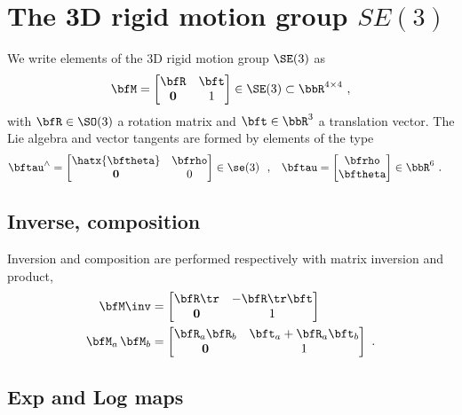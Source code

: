 

\section{The 3D rigid motion group $SE(3)$}
\label{sec:SE3}


We write elements of the 3D rigid motion group $\SE(3)$ as 
%
\begin{align}
\bfM= \begin{bmatrix}
\bfR & \bft \\ \bf0 & 1
\end{bmatrix} \in \SE(3) \subset \bbR^{4\times4}
~,
\end{align}
%
with $\bfR\in\SO(3)$ a rotation matrix and $\bft\in\bbR^3$ a translation vector.
The Lie algebra and vector tangents are formed by elements of the type
%
\begin{align}
\bftau^\wedge
  &= \begin{bmatrix}\hatx{\bth} & \bfrho \\ \bf0 & 0\end{bmatrix} \in \se(3)
  ~~,
& 
\bftau
  &= \begin{bmatrix}\bfrho \\ \bth\end{bmatrix}\in\bbR^6 
~.
\end{align}
%


\subsection{Inverse, composition}

Inversion and composition are performed respectively with matrix inversion and product,
%
\begin{align}
\bfM\inv &= \begin{bmatrix}
\bfR\tr & -\bfR\tr\bft \\ \bf0 & 1
\end{bmatrix} 
\\
\bfM_a\,\bfM_b &= \begin{bmatrix}
\bfR_a\bfR_b & \bft_a+\bfR_a\bft_b \\ \bf0 & 1
\end{bmatrix} 
~.
\end{align}



\subsection{Exp and Log maps}

